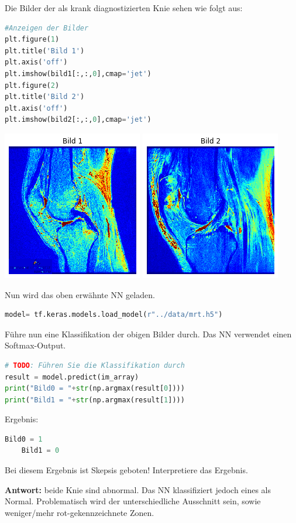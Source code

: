 \documentclass[a4paper,10pt,titlepage]{scrartcl}
\begin{document}
Die Bilder der als krank diagnostizierten Knie sehen wie folgt aus:
\begin{lstlisting}[language=python]
#Anzeigen der Bilder
plt.figure(1)
plt.title('Bild 1')
plt.axis('off')
plt.imshow(bild1[:,:,0],cmap='jet')
plt.figure(2)
plt.title('Bild 2')
plt.axis('off')
plt.imshow(bild2[:,:,0],cmap='jet')
\end{lstlisting}
\begin{center}
    \includegraphics[width=.2\linewidth]{Assets/prakBMT-DeepLearning-06.png}
    \includegraphics[width=.2\linewidth]{Assets/prakBMT-DeepLearning-07.png}
\end{center}

Nun wird das oben erwähnte NN geladen.

\begin{lstlisting}[language=python]
model= tf.keras.models.load_model(r"../data/mrt.h5")
\end{lstlisting}

Führe nun eine Klassifikation der obigen Bilder durch. Das NN verwendet einen Softmax-Output.

\begin{lstlisting}[language=python]
# TODO: Führen Sie die Klassifikation durch
result = model.predict(im_array)
print("Bild0 = "+str(np.argmax(result[0])))
print("Bild1 = "+str(np.argmax(result[1])))
\end{lstlisting}
Ergebnis:
\begin{lstlisting}[language=python]
    Bild0 = 1
    Bild1 = 0
\end{lstlisting}

Bei diesem Ergebnis ist Skepsis geboten! Interpretiere das Ergebnis.

\textbf{Antwort:} beide Knie sind abnormal. Das NN klassifiziert jedoch eines als Normal. Problematisch wird der unterschiedliche Ausschnitt sein, sowie weniger/mehr rot-gekennzeichnete Zonen.
\end{document}
